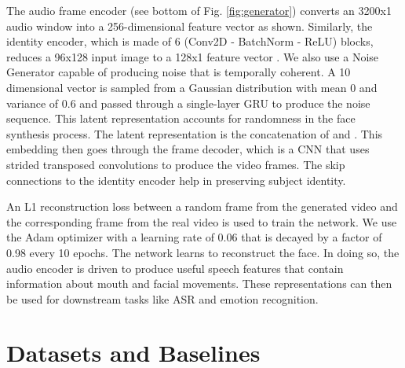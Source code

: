 \documentclass{article}
\begin{document}
The audio frame encoder (see bottom of Fig. \ref{fig:generator}) converts an 3200x1 audio window into a 256-dimensional feature vector  as shown. Similarly, the identity encoder, which is made of 6 (Conv2D - BatchNorm - ReLU) blocks, reduces
a 96x128 input image to a 128x1 feature vector . We also use a Noise Generator capable of producing noise that is temporally coherent. A 10 dimensional vector is sampled from a Gaussian distribution with mean 0 and variance of 0.6 and passed through a single-layer GRU to produce the noise sequence. This latent representation  accounts for randomness in the face synthesis process. The latent representation is the concatenation of  and . This embedding then goes through the frame decoder, which is a CNN that uses strided transposed convolutions to produce the video frames. The skip connections to the identity encoder help in preserving subject identity.

An L1 reconstruction loss between a random frame from the generated video and the corresponding frame from the real video is used to train the network. We use the Adam optimizer with a learning rate of 0.06 that is decayed by a factor of 0.98 every 10 epochs. The network learns to reconstruct the face. In doing so, the audio encoder is driven to produce useful speech features that contain information about mouth and facial movements. These representations can then be used for downstream tasks like ASR and emotion recognition.

\section{Datasets and Baselines}
\label{sec:majhead}
\end{document}

